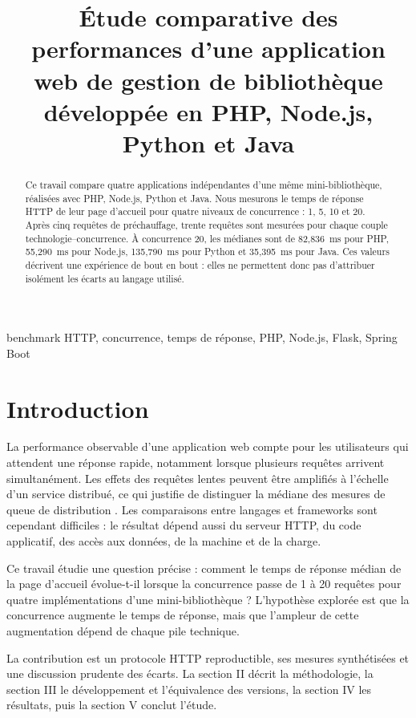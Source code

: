 \documentclass[conference,11pt]{IEEEtran}
\title{Étude comparative des performances d'une application web de gestion de bibliothèque développée en PHP, Node.js, Python et Java}
\author{
\IEEEauthorblockN{Kintaudi Ndinda Benjamine}
\IEEEauthorblockA{FASI, UPC\\
\texttt{benjaminendinda@gmail.com}}
\and
\IEEEauthorblockN{Lisongo Ekonzo Catherine}
\IEEEauthorblockA{FASI, UPC\\
\texttt{lisongocathy8@gmail.com}}
\and
\IEEEauthorblockN{Inaka La Joie La Joie}
\IEEEauthorblockA{FASI, UPC\\
\texttt{Inakalajoie@gmail.com}}
\and
\IEEEauthorblockN{Mona Elameji Pauline}
\IEEEauthorblockA{FASI, UPC\\
\texttt{Paulelameji@gmail.com}}
\and
\IEEEauthorblockN{Lomami Ekanga Nana}
\IEEEauthorblockA{FASI, UPC\\
\texttt{djulianalomami3@gmail.com}}
}
\begin{document}
\maketitle

\begin{abstract}
Ce travail compare quatre applications indépendantes d'une même
mini-bibliothèque, réalisées avec PHP, Node.js, Python et Java. Nous mesurons
le temps de réponse HTTP de leur page d'accueil pour quatre niveaux de
concurrence : 1, 5, 10 et 20. Après cinq requêtes de préchauffage, trente
requêtes sont mesurées pour chaque couple technologie--concurrence.
À concurrence 20, les médianes sont de 82,836~ms pour PHP, 55,290~ms pour
Node.js, 135,790~ms pour Python et 35,395~ms pour Java. Ces valeurs décrivent
une expérience de bout en bout : elles ne permettent donc pas d'attribuer
isolément les écarts au langage utilisé.
\end{abstract}

\begin{IEEEkeywords}
benchmark HTTP, concurrence, temps de réponse, PHP, Node.js, Flask, Spring Boot
\end{IEEEkeywords}

\section{Introduction}

La performance observable d'une application web compte pour les utilisateurs
qui attendent une réponse rapide, notamment lorsque plusieurs requêtes
arrivent simultanément. Les effets des requêtes lentes peuvent être amplifiés
à l'échelle d'un service distribué, ce qui justifie de distinguer la médiane
des mesures de queue de distribution \cite{tail}. Les comparaisons entre langages et frameworks sont
cependant difficiles : le résultat dépend aussi du serveur HTTP, du code
applicatif, des accès aux données, de la machine et de la charge.

Ce travail étudie une question précise : comment le temps de réponse médian de
la page d'accueil évolue-t-il lorsque la concurrence passe de 1 à 20 requêtes
pour quatre implémentations d'une mini-bibliothèque ? L'hypothèse explorée
est que la concurrence augmente le temps de réponse, mais que l'ampleur de
cette augmentation dépend de chaque pile technique.

La contribution est un protocole HTTP reproductible, ses mesures synthétisées
et une discussion prudente des écarts. La section II décrit la méthodologie,
la section III le développement et l'équivalence des versions, la section IV
les résultats, puis la section V conclut l'étude.
\end{document}
